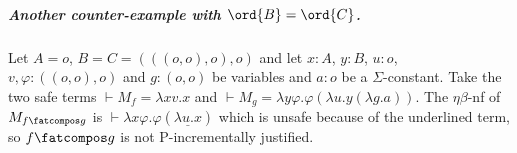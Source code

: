 \subparagraph{Another counter-example with $\ord{B} = \ord{C}$.}

Let $A=o$, $B=C=(((o,o),o),o)$ and let $x:A$, $y:B$, $u:o$, $v,\varphi:((o,o),o)$
and $g:(o,o)$ be variables and  $a:o$ be a $\Sigma$-constant. Take the two safe terms $\vdash  M_f = \lambda x v.x$ and $\vdash M_g = \lambda y \varphi. \varphi (\lambda u . y (\lambda g. a))$.
The $\eta\beta$-nf of $M_{f\fatcompos g}$ is $\vdash \lambda x \varphi. \varphi (\underline{\lambda u . x})$ which is unsafe because of the underlined term, so
$f\fatcompos g$ is not P-incrementally justified.
